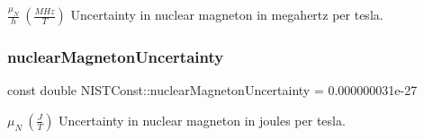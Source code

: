 $\frac{\mu_N}{h} \ (\frac{MHz}{T})$ Uncertainty in nuclear magneton in megahertz per tesla. \mbox{\label{group___nuclear_magneton_ga1f693f4e6c1d8f771594a847e185b072}} 
\subsubsection{\texorpdfstring{nuclear\+Magneton\+Uncertainty}{nuclearMagnetonUncertainty}}
{\footnotesize\ttfamily const double N\+I\+S\+T\+Const\+::nuclear\+Magneton\+Uncertainty = 0.\+000000031e-\/27}

$\mu_N \ (\frac{J}{T})$ Uncertainty in nuclear magneton in joules per tesla. 